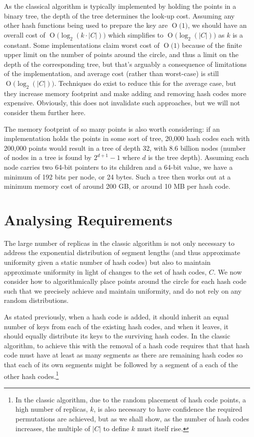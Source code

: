 \documentclass[runningheads,a4paper]{llncs}
\newcommand{\BigO}[1]{\ensuremath{\operatorname{O}\bigl(#1\bigr)}}
\begin{document}
As the classical algorithm is typically implemented by holding the
points in a binary tree, the depth of the tree determines the look-up
cost. Assuming any other hash functions being used to prepare the key
are $\BigO{1}$, we should have an overall cost of $\BigO{\log_2(k
  \cdot |C|)}$ which simplifies to $\BigO{\log_2(|C|)}$ as $k$ is a
constant. Some implementations claim worst cost of $\BigO{1}$ because
of the finite upper limit on the number of points around the circle,
and thus a limit on the depth of the corresponding tree, but that's
arguably a consequence of limitations of the implementation, and
average cost (rather than worst-case) is still
$\BigO{\log_2(|C|)}$. Techniques do exist to reduce this for the
average case, but they increase memory footprint and make adding and
removing hash codes more expensive. Obviously, this does not
invalidate such approaches, but we will not consider them further
here.

The memory footprint of so many points is also worth considering: if
an implementation holds the points in some sort of tree, 20,000 hash
codes each with 200,000 points would result in a tree of depth 32,
with 8.6 billion nodes (number of nodes in a tree is found by $2^{d+1}
- 1$ where $d$ is the tree depth). Assuming each node carries two
64-bit pointers to its children and a 64-bit value, we have a minimum
of 192 bits per node, or 24 bytes. Such a tree then works out at a
minimum memory cost of around 200 GB, or around 10 MB per hash code.

\section{Analysing Requirements}

The large number of replicas in the classic algorithm is not only
necessary to address the exponential distribution of segment lengths
(and thus approximate uniformity given a static number of hash codes)
but also to maintain approximate uniformity in light of changes to the
set of hash codes, $C$. We now consider how to algorithmically place
points around the circle for each hash code such that we precisely
achieve and maintain uniformity, and do not rely on any random
distributions.

As stated previously, when a hash code is added, it should inherit an
equal number of keys from each of the existing hash codes, and when it
leaves, it should equally distribute its keys to the surviving hash
codes. In the classic algorithm, to achieve this with the removal of a
hash code requires that that hash code must have at least as many
segments as there are remaining hash codes so that each of its own
segments might be followed by a segment of a each of the other hash
codes.\footnote{In the classic algorithm, due to the random placement
  of hash code points, a high number of replicas, $k$, is also
  necessary to have confidence the required permutations are achieved,
  but as we shall show, as the number of hash codes increases, the
  multiple of $|C|$ to define $k$ must itself rise.}
\end{document}
